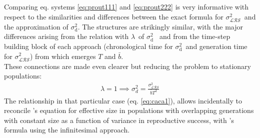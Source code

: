 \documentclass[10pt,a4paper]{article}
\newcommand{\lam}{$\lambda$}
\newcommand{\vLRO}{$\sigma_{\mathrm{\mathcal{LRS}}}^2$}
\newcommand{\vd}{$\sigma_{\mathrm{d}}^2$}
\begin{document}
Comparing eq. systems \ref{eq:prout111} and \ref{eq:prout222} is very informative with respect to the similarities and differences between the exact formula for \vLRO\ and the approximation of \vd. The structures are strikingly similar, with the major differences arising from the relation with \lam \ of \vd\
and from the time-step building block of each approach (chronological time for \vd\ and generation time for \vLRO) from which emerges $T$ and $\bar{b}$. \\

These connections are made even clearer but reducing the problem to stationary populations:  
\begin{eqnarray}
\lambda=1 \implies \sigma^{2}_{d}=\frac{\sigma^{2}_{\mathcal{LRS}}}{\bar{b}T^2} 
\label{eq:caca1}
\end{eqnarray}
The relationship in that particular case (eq. \ref{eq:caca1}), allows incidentally to reconcile \citet{Hill1972}'s equation for effective size in populations with overlapping generations with constant size as a function of variance in reproductive success, with \citet{Engen2005}'s formula using the infinitesimal approach.





\end{document}
